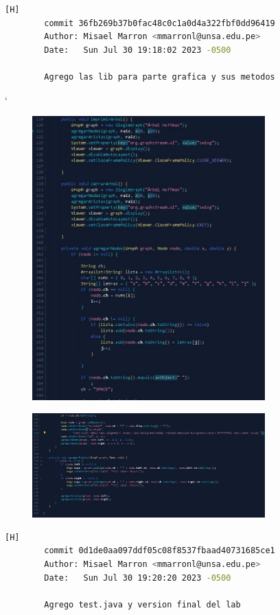 \documentclass{article}
\begin{document}
	\clearpage
	\begin{lstlisting}[language=bash,caption={Mi tercer commit es cuando agregue la parte grafica con todos los metodos que hacen posible el grafo.}][H]
		commit 36fb269b37b0fac48c0c1a0d4a322fbf0dd96419
		Author: Misael Marron <mmarronl@unsa.edu.pe>
		Date:   Sun Jul 30 19:18:02 2023 -0500

   		Agrego las lib para parte grafica y sus metodos
	\end{lstlisting}

`	\begin{figure}[H]
		\centering
		\includegraphics[width=0.8\textwidth,keepaspectratio]{img/codigo3.jpg}	
	\end{figure}
	\begin{figure}[H]
		\centering
		\includegraphics[width=0.8\textwidth,keepaspectratio]{img/codigo3b.jpg}	
	\end{figure}
	\clearpage
	\begin{lstlisting}[language=bash,caption={Mi cuarto commit y ultimo es cuando agregue test y el final de mi laboratorio}][H]
		commit 0d1de0aa097ddf05c08f8537fbaad40731685ce1 
		Author: Misael Marron <mmarronl@unsa.edu.pe>
		Date:   Sun Jul 30 19:20:20 2023 -0500

    	Agrego test.java y version final del lab
	\end{lstlisting}
	
\end{document}
